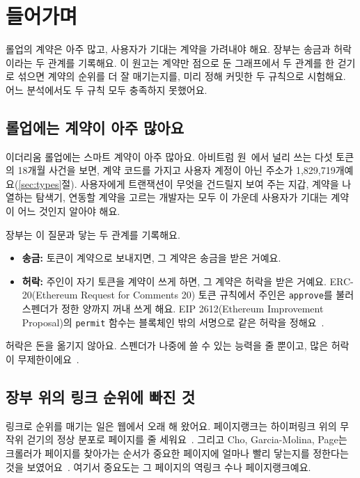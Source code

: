 \section{들어가며}
\label{sec:intro}

\begin{yoji}
롤업의 계약은 아주 많고, 사용자가 기대는 계약을 가려내야 해요. 장부는 송금과 허락이라는 두 관계를 기록해요. 이 원고는 계약만 점으로 둔 그래프에서 두 관계를 한 걷기로 섞으면 계약의 순위를 더 잘 매기는지를, 미리 정해 커밋한 두 규칙으로 시험해요. 어느 분석에서도 두 규칙 모두 충족하지 못했어요.
\end{yoji}

\subsection{롤업에는 계약이 아주 많아요}

이더리움 롤업에는 스마트 계약이 아주 많아요. 아비트럼 원~\cite{kalodner2018arbitrum}에서 널리 쓰는 다섯 토큰의 18개월 사건을 보면, 계약 코드를 가지고 사용자 계정이 아닌 주소가 1,829,719개예요(\ref{sec:types}절). 사용자에게 트랜잭션이 무엇을 건드릴지 보여 주는 지갑, 계약을 나열하는 탐색기, 연동할 계약을 고르는 개발자는 모두 이 가운데 사용자가 기대는 계약이 어느 것인지 알아야 해요.

장부는 이 질문과 닿는 두 관계를 기록해요.
\begin{itemize}
\item \textbf{송금:} 토큰이 계약으로 보내지면, 그 계약은 송금을 받은 거예요.
\item \textbf{허락:} 주인이 자기 토큰을 계약이 쓰게 하면, 그 계약은 허락을 받은 거예요. ERC-20(Ethereum Request for Comments 20) 토큰 규칙에서 주인은 \texttt{approve}를 불러 스펜더가 정한 양까지 꺼내 쓰게 해요. EIP 2612(Ethereum Improvement Proposal)의 \texttt{permit} 함수는 블록체인 밖의 서명으로 같은 허락을 정해요~\cite{vogelsteller2015erc20,lundfall2020permit}.
\end{itemize}
허락은 돈을 옮기지 않아요. 스펜더가 나중에 쓸 수 있는 능력을 줄 뿐이고, 많은 허락이 무제한이에요~\cite{wang2022unlimited}.

\subsection{장부 위의 링크 순위에 빠진 것}

링크로 순위를 매기는 일은 웹에서 오래 해 왔어요. 페이지랭크는 하이퍼링크 위의 무작위 걷기의 정상 분포로 페이지를 줄 세워요~\cite{page1999pagerank}. 그리고 Cho, Garcia-Molina, Page는 크롤러가 페이지를 찾아가는 순서가 중요한 페이지에 얼마나 빨리 닿는지를 정한다는 것을 보였어요~\cite{cho1998crawling}. 여기서 중요도는 그 페이지의 역링크 수나 페이지랭크예요.

